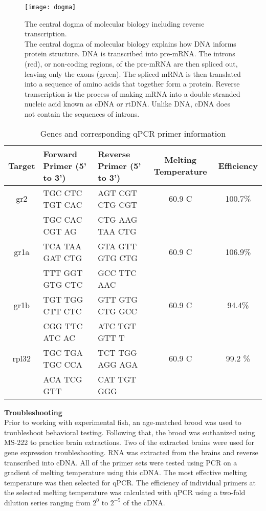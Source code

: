 \documentclass[12pt,twoside]{reedthesis}
\begin{document}
\begin{figure}[htbp] 
\begin{center} 
\texttt{[image: dogma]}
\caption[The central dogma of molecular biology including reverse transcription]{\footnotesize{The
    central dogma of molecular biology including reverse transcription. \\ The
    central dogma of molecular biology explains how DNA informs protein
    structure. DNA is transcribed into pre-mRNA. The introns (red), or non-coding
    regions, of the pre-mRNA are then spliced out, leaving only the exons
    (green). The spliced mRNA is then translated into a sequence of amino acids
    that together form a protein. Reverse transcription is the process of making
  mRNA into a double stranded nucleic acid known as cDNA or rtDNA. Unlike DNA, cDNA
  does not contain the sequences of introns.}} 
\label{subd}
\end{center} 
\end{figure}

\begin{table}[htbp]
\caption[Genes and corresponding qPCR primer information]{Genes and corresponding
 qPCR primer information}
\begin{center}
\footnotesize
\begin{tabular}{ | c | l | l | c | c |}
\hline
Target & Forward Primer (5' to 3')& Reverse Primer (5' to 3') & Melting Temperature & Efficiency\\
\hline
gr2 & TGC CTC TGT CAC & AGT CGT CTG CGT & 60.9 \textdegree{}C& 100.7\%\\
  &  TGC CAC CGT AG & CTG AAG TAA CTG & & \\
\hline
  gr1a & TCA TAA GAT CTG& GTA GTT GTG CTG & 60.9 \textdegree{}C& 106.9\% \\
  &  TTT GGT GTG CTC &  GCC TTC AAC & & \\
\hline
    gr1b & TGT TGG CTT CTC  & GTT GTG CTG GCC & 60.9 \textdegree{}C& 94.4\%\\
  & CGG TTC ATC AC & ATC TGT GTT T & & \\
\hline
    rpl32 & TGC TGA TGC CCA & TCT TGG AGG AGA & 60.9 \textdegree{}C& 99.2 \%\\
  & ACA TCG GTT & CAT TGT GGG & & \\
\hline
\end{tabular}
\end{center}
\end{table}

\noindent\textbf{Troubleshooting}\\
Prior to working with experimental fish, an age-matched brood was used to
troubleshoot behavioral testing. Following that, the brood was euthanized using
MS-222 to practice brain extractions. Two of the extracted brains were used for
gene expression troubleshooting. RNA was extracted from the brains and reverse
transcribed into cDNA. All of the primer sets were tested using PCR on a gradient of
melting temperature using this cDNA. The most effective melting temperature was
then selected for qPCR. The efficiency of individual primers at the selected
melting temperature was calculated with qPCR using a two-fold dilution series
ranging from $2^0$ to $2^{-5}$ of the cDNA.
\end{document}
